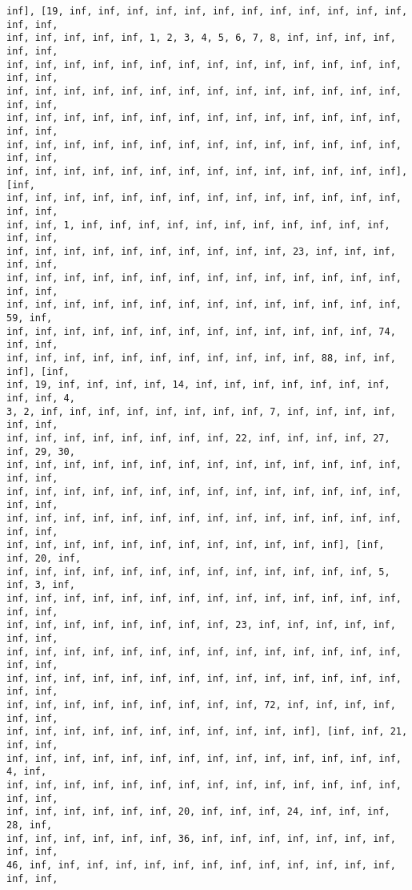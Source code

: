 \documentclass[11pt]{article}
\begin{document}
\begin{Verbatim}[commandchars=\\\{\}]
inf], [19, inf, inf, inf, inf, inf, inf, inf, inf, inf, inf, inf, inf, inf, inf,
inf, inf, inf, inf, inf, 1, 2, 3, 4, 5, 6, 7, 8, inf, inf, inf, inf, inf, inf,
inf, inf, inf, inf, inf, inf, inf, inf, inf, inf, inf, inf, inf, inf, inf, inf,
inf, inf, inf, inf, inf, inf, inf, inf, inf, inf, inf, inf, inf, inf, inf, inf,
inf, inf, inf, inf, inf, inf, inf, inf, inf, inf, inf, inf, inf, inf, inf, inf,
inf, inf, inf, inf, inf, inf, inf, inf, inf, inf, inf, inf, inf, inf, inf, inf,
inf, inf, inf, inf, inf, inf, inf, inf, inf, inf, inf, inf, inf, inf], [inf,
inf, inf, inf, inf, inf, inf, inf, inf, inf, inf, inf, inf, inf, inf, inf, inf,
inf, inf, 1, inf, inf, inf, inf, inf, inf, inf, inf, inf, inf, inf, inf, inf,
inf, inf, inf, inf, inf, inf, inf, inf, inf, inf, 23, inf, inf, inf, inf, inf,
inf, inf, inf, inf, inf, inf, inf, inf, inf, inf, inf, inf, inf, inf, inf, inf,
inf, inf, inf, inf, inf, inf, inf, inf, inf, inf, inf, inf, inf, inf, 59, inf,
inf, inf, inf, inf, inf, inf, inf, inf, inf, inf, inf, inf, inf, 74, inf, inf,
inf, inf, inf, inf, inf, inf, inf, inf, inf, inf, inf, 88, inf, inf, inf], [inf,
inf, 19, inf, inf, inf, inf, 14, inf, inf, inf, inf, inf, inf, inf, inf, inf, 4,
3, 2, inf, inf, inf, inf, inf, inf, inf, inf, 7, inf, inf, inf, inf, inf, inf,
inf, inf, inf, inf, inf, inf, inf, inf, 22, inf, inf, inf, inf, 27, inf, 29, 30,
inf, inf, inf, inf, inf, inf, inf, inf, inf, inf, inf, inf, inf, inf, inf, inf,
inf, inf, inf, inf, inf, inf, inf, inf, inf, inf, inf, inf, inf, inf, inf, inf,
inf, inf, inf, inf, inf, inf, inf, inf, inf, inf, inf, inf, inf, inf, inf, inf,
inf, inf, inf, inf, inf, inf, inf, inf, inf, inf, inf, inf], [inf, inf, 20, inf,
inf, inf, inf, inf, inf, inf, inf, inf, inf, inf, inf, inf, inf, 5, inf, 3, inf,
inf, inf, inf, inf, inf, inf, inf, inf, inf, inf, inf, inf, inf, inf, inf, inf,
inf, inf, inf, inf, inf, inf, inf, inf, 23, inf, inf, inf, inf, inf, inf, inf,
inf, inf, inf, inf, inf, inf, inf, inf, inf, inf, inf, inf, inf, inf, inf, inf,
inf, inf, inf, inf, inf, inf, inf, inf, inf, inf, inf, inf, inf, inf, inf, inf,
inf, inf, inf, inf, inf, inf, inf, inf, inf, 72, inf, inf, inf, inf, inf, inf,
inf, inf, inf, inf, inf, inf, inf, inf, inf, inf, inf], [inf, inf, 21, inf, inf,
inf, inf, inf, inf, inf, inf, inf, inf, inf, inf, inf, inf, inf, inf, 4, inf,
inf, inf, inf, inf, inf, inf, inf, inf, inf, inf, inf, inf, inf, inf, inf, inf,
inf, inf, inf, inf, inf, inf, 20, inf, inf, inf, 24, inf, inf, inf, 28, inf,
inf, inf, inf, inf, inf, inf, 36, inf, inf, inf, inf, inf, inf, inf, inf, inf,
46, inf, inf, inf, inf, inf, inf, inf, inf, inf, inf, inf, inf, inf, inf, inf,

\end{Verbatim}
\end{document}
